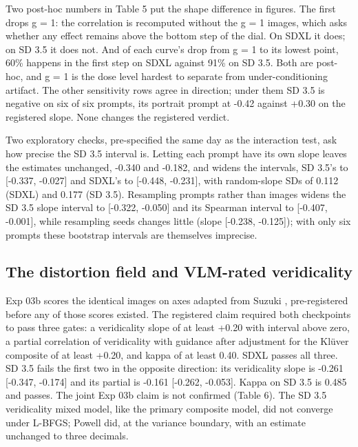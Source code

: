 \documentclass[11pt]{article}
\begin{document}
Two post-hoc numbers in Table 5 put the shape difference in figures. The first
drops g = 1: the correlation is recomputed without the g = 1 images, which asks
whether any effect remains above the bottom step of the dial. On SDXL it does;
on SD 3.5 it does not. And of each curve's drop from g = 1 to its lowest point,
60\% happens in the first step on SDXL against 91\% on SD 3.5. Both are
post-hoc, and g = 1 is the dose level hardest to separate from
under-conditioning artifact. The other sensitivity rows agree in direction;
under them SD 3.5 is negative on six of six prompts, its portrait prompt at
-0.42 against +0.30 on the registered slope. None changes the registered
verdict.

Two exploratory checks, pre-specified the same day as the interaction test, ask
how precise the SD 3.5 interval is. Letting each prompt have its own slope
leaves the estimates unchanged, -0.340 and -0.182, and widens the intervals, SD
3.5's to {[}-0.337, -0.027{]} and SDXL's to {[}-0.448, -0.231{]}, with
random-slope SDs of 0.112 (SDXL) and 0.177 (SD 3.5). Resampling prompts rather
than images widens the SD 3.5 slope interval to {[}-0.322, -0.050{]} and its
Spearman interval to {[}-0.407, -0.001{]}, while resampling seeds changes little
(slope {[}-0.238, -0.125{]}); with only six prompts these bootstrap intervals
are themselves imprecise.

\subsection{The distortion field and VLM-rated
veridicality}\label{the-distortion-field-and-vlm-rated-veridicality}

Exp 03b scores the identical images on axes adapted from Suzuki
\citep{suzuki2024}, pre-registered before any of those scores existed. The
registered claim required both checkpoints to pass three gates: a veridicality
slope of at least +0.20 with interval above zero, a partial correlation of
veridicality with guidance after adjustment for the Klüver composite of at least
+0.20, and kappa of at least 0.40. SDXL passes all three. SD 3.5 fails the first
two in the opposite direction: its veridicality slope is -0.261 {[}-0.347,
-0.174{]} and its partial is -0.161 {[}-0.262, -0.053{]}. Kappa on SD 3.5 is
0.485 and passes. The joint Exp 03b claim is not confirmed (Table 6). The SD 3.5
veridicality mixed model, like the primary composite model, did not converge
under L-BFGS; Powell did, at the variance boundary, with an estimate unchanged
to three decimals.
\end{document}
